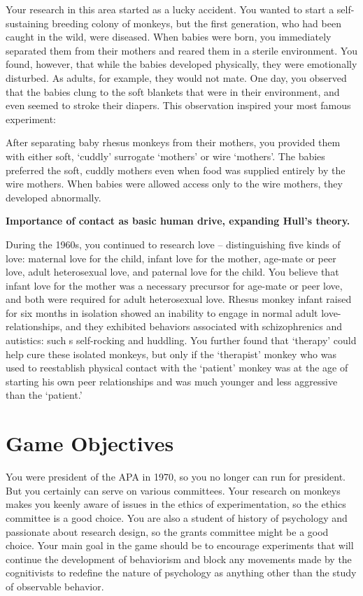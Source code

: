 \begin{refsection}
Your research in this area started as a lucky accident. You wanted to start a self-sustaining breeding colony of monkeys, but the first generation, who had been caught in the wild, were diseased. When babies were born, you immediately separated them from their mothers and reared them in a sterile environment. You found, however, that while the babies developed physically, they were emotionally disturbed. As adults, for example, they would not mate. One day, you observed that the babies clung to the soft blankets that were in their environment, and even seemed to stroke their diapers. This observation inspired your most famous experiment:

After separating baby rhesus monkeys from their mothers, you provided them with either soft, `cuddly' surrogate `mothers' or wire `mothers'. The babies preferred the soft, cuddly mothers even when food was supplied entirely by the wire mothers. When babies were allowed access only to the wire mothers, they developed abnormally.

\textbf{Importance of contact as basic human drive, expanding Hull's theory.}

During the 1960s, you continued to research love – distinguishing five kinds of love: maternal love for the child, infant love for the mother, age-mate or peer love, adult heterosexual love, and paternal love for the child. You believe that infant love for the mother was a necessary precursor for age-mate or peer love, and both were required for adult heterosexual love. Rhesus monkey infant raised for six months in isolation showed an inability to engage in normal adult love-relationships, and they exhibited behaviors associated with schizophrenics and autistics: such s self-rocking and huddling. You further found that `therapy' could help cure these isolated monkeys, but only if the `therapist' monkey who was used to reestablish physical contact with the `patient' monkey was at the age of starting his own peer relationships and was much younger and less aggressive than the `patient.'

\section{Game Objectives}
\label{gameobjectives}

You were president of the APA in 1970, so you no longer can run for president. But you certainly can serve on various committees. Your research on monkeys makes you keenly aware of issues in the ethics of experimentation, so the ethics committee is a good choice. You are also a student of history of psychology and passionate about research design, so the grants committee might be a good choice. Your main goal in the game should be to encourage experiments that will continue the development of behaviorism and block any movements made by the cognitivists to redefine the nature of psychology as anything other than the study of observable behavior.


\end{refsection}
